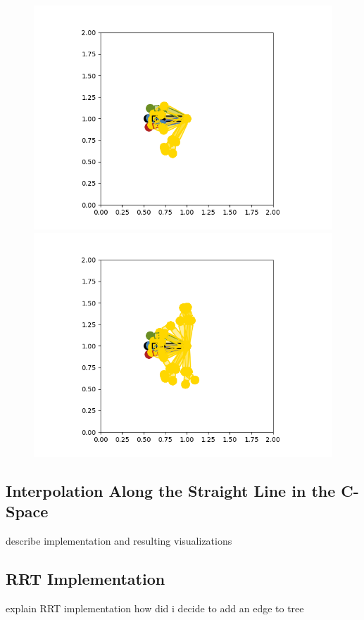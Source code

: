 \documentclass{article}
\begin{document}
\begin{figure}[htbp]
\begin{minipage}{0.45\textwidth}
    \includegraphics[width=\linewidth]{p1.2.ec10n.png}
    \caption{}
  \end{minipage}\hfill
  \begin{minipage}{0.45\textwidth}
    \includegraphics[width=\linewidth]{p1.2.ec20n.png}
    \caption{}
  \end{minipage}
\end{figure}
\subsection{Interpolation Along the Straight Line in the C-Space}
describe implementation and resulting visualizations
\subsection{RRT Implementation}
explain RRT implementation
how did i decide to add an edge to tree
\end{document}
